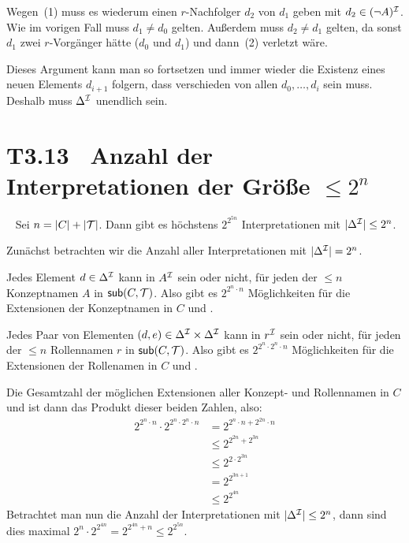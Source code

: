 \documentclass[fontsize=11pt, twoside=false, numbers=autoenddot]{scrbook}
\begin{document}
Wegen~(1) muss es wiederum einen $r$-Nachfolger $d_2$ von $d_1$ geben
mit $d_2 \in (\lnot A)^\mathcal{I}$. Wie im vorigen Fall muss $d_1 \neq d_0$ gelten.
Außerdem muss $d_2 \neq d_1$ gelten, da sonst $d_1$ zwei $r$-Vorgänger hätte ($d_0$ und $d_1$)
und dann~(2) verletzt wäre.

Dieses Argument kann man so fortsetzen und immer wieder die Existenz eines neuen Elements
$d_{i+1}$ folgern, dass verschieden von allen $d_0,\dots,d_i$ sein muss.
Deshalb muss $\Delta^\mathcal{I}$ unendlich sein.

\section*{T3.13~ Anzahl der Interpretationen der Größe {\boldmath $\leq 2^n$}}

~
Sei $n = |C| + |\mathcal{T}|$.
Dann gibt es höchstens $2^{2^{5n}}$ Interpretationen \Imc mit $|\Delta^\mathcal{I}| \leq 2^n$.

\par\noindent
\begin{beweis}
  Zunächst betrachten wir die Anzahl aller Interpretationen \Imc mit $|\Delta^\mathcal{I}| = 2^n$.
  
  Jedes Element $d \in \Delta^\mathcal{I}$ kann in $A^\mathcal{I}$ sein oder nicht,
  für jeden der $\leq n$ Konzeptnamen $A$ in $\textsf{sub}(C,\mathcal{T})$.
  Also gibt es $2^{2^n \cdot n}$ Möglichkeiten für die Extensionen
  der Konzeptnamen in $C$ und \Tmc.

  Jedes Paar von Elementen $(d,e) \in \Delta^\mathcal{I} \times \Delta^\mathcal{I}$
  kann in $r^\mathcal{I}$ sein oder nicht,
  für jeden der $\leq n$ Rollennamen $r$ in $\textsf{sub}(C,\mathcal{T})$.
  Also gibt es $2^{2^n \cdot 2^n \cdot n}$ Möglichkeiten für die Extensionen
  der Rollenamen in $C$ und \Tmc.
  
  Die Gesamtzahl der möglichen Extensionen aller Konzept- und Rollennamen
  in $C$ und \Tmc ist dann das Produkt dieser beiden Zahlen, also:
  \begin{align*}
    2^{2^n \cdot n} \cdot 2^{2^n \cdot 2^n \cdot n}
    & = 2^{2^n \cdot n + 2^{2n} \cdot n}             \\
    & \leq 2^{2^{2n} + 2^{3n}}                       \\
    & \leq 2^{2 \cdot 2^{3n}}                        \\
    & = 2^{2^{3n+1}}                                 \\
    & \leq 2^{2^{4n}}
  \end{align*}
  Betrachtet man nun die Anzahl der Interpretationen \Imc mit $|\Delta^\mathcal{I}| \leq 2^n$,
  dann sind dies maximal $2^n \cdot 2^{2^{4n}} = 2^{2^{4n}+n} \leq 2^{2^{5n}}$.
  \qedhere
\end{beweis}
\end{document}
